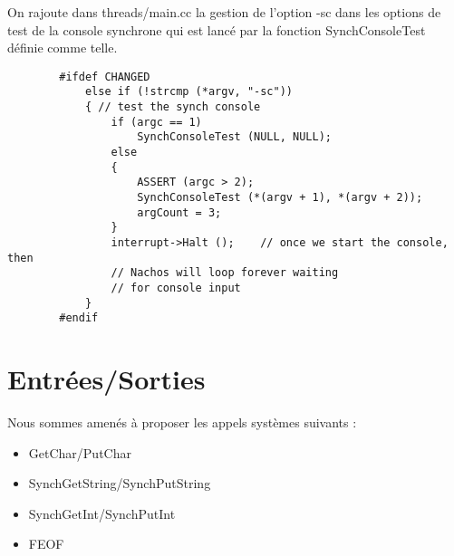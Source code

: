 \documentclass[a4paper,10pt]{article}
\begin{document}
    On rajoute dans threads/main.cc la gestion de l'option -sc dans les options de test de la console synchrone qui est lancé par la fonction SynchConsoleTest définie comme telle.

    \begin{lstlisting}
        #ifdef CHANGED
            else if (!strcmp (*argv, "-sc"))
            { // test the synch console
                if (argc == 1)
                    SynchConsoleTest (NULL, NULL);
                else
                {
                    ASSERT (argc > 2);
                    SynchConsoleTest (*(argv + 1), *(argv + 2));
                    argCount = 3;
                }
                interrupt->Halt ();    // once we start the console, then
                // Nachos will loop forever waiting
                // for console input
            }
        #endif
    \end{lstlisting}

\section{Entrées/Sorties}
    Nous sommes amenés à proposer les appels systèmes suivants :
    \begin{itemize}
        \item GetChar/PutChar
        \item SynchGetString/SynchPutString
        \item SynchGetInt/SynchPutInt
        \item FEOF
    \end{itemize}
\end{document}
